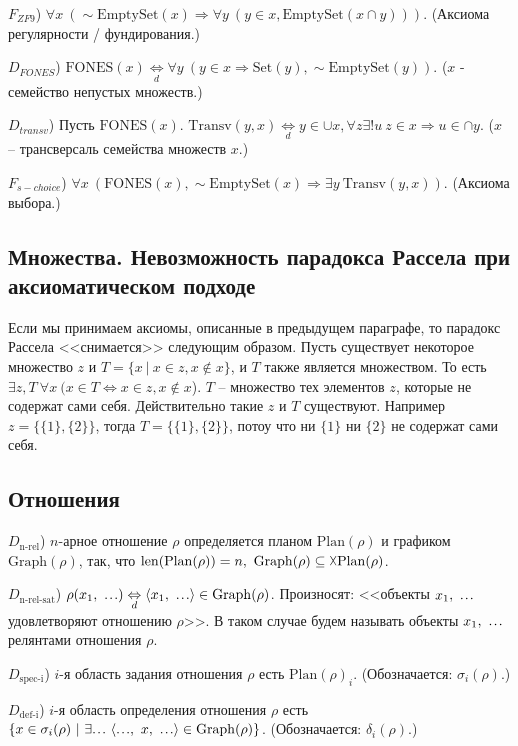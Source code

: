 \documentclass[a4paper]{article}
\newcommand\mydots{\hbox to 1em{.\hss.\hss.}}
\newcommand{\Def}[0]{\underset{d}{\Leftrightarrow}}
\newcommand{\Plan}[1]{\mathrm{Plan}(#1)}
\newcommand{\Graph}[1]{\mathrm{Graph}(#1)}
\newcommand{\len}[1]{\mathrm{len}(#1)}
\newcommand{\EmptySet}[1]{\mathrm{EmptySet}(#1)}
\newcommand{\FONES}[1]{\mathrm{FONES}(#1)}
\newcommand{\Set}[1]{\mathrm{Set}(#1)}
\newcommand{\Transv}[2]{\mathrm{Transv}(#1, #2)}
\begin{document}
$F_{ZF9}$) $\forall x~ (\sim \EmptySet{x} \Rightarrow \forall y~ (y \in x, \EmptySet{x \cap y}))$. (Аксиома регулярности / фундирования.)

$D_{FONES}$) $\FONES{x} \Def \forall y~ (y \in x \Rightarrow \Set{y}, \sim \EmptySet{y})$. ($x$ - семейство непустых множеств.)

$D_{transv}$) Пусть $\FONES{x}$. $\Transv{y}{x} \Def y \in \cup x, \forall z \exists! u~ z \in x \Rightarrow u \in \cap y$. ($x$ -- трансверсаль семейства множеств $x$.)

$F_{s-choice}$) $\forall x~ (\FONES{x}, \sim \EmptySet{x} \Rightarrow \exists y~ \Transv{y}{x})$. (Аксиома выбора.)

\subsection{Множества. Невозможность парадокса Рассела при аксиоматическом подходе}

Если мы принимаем аксиомы, описанные в предыдущем параграфе, то парадокс Рассела <<снимается>> следующим образом. Пусть существует некоторое множество $z$ и $T = \{x ~|~ x \in z, x \notin x\}$, и $T$ также является множеством. То есть $\exists z, T~ \forall x~ (x \in T \Leftrightarrow x \in z, x \notin x$). $T$ -- множество тех элементов $z$, которые не содержат сами себя. Действительно такие $z$ и $T$ существуют. Например $z = \{\{1\}, \{2\}\}$, тогда $T = \{\{1\}, \{2\}\}$, потоу что ни $\{1\}$ ни $\{2\}$ не содержат сами себя.

\subsection{Отношения}

$D_\text{n-rel}$) $n$-арное отношение $\rho$ определяется планом $\Plan{\rho}$ и графиком $\Graph{\rho}$, так, что $\len{\Plan{\rho}} = n,~ \Graph{\rho} \subseteq \vartimes \Plan{\rho}$.

$D_\text{n-rel-sat}$) $\rho(x_1,~ \mydots) \Def \langle x_1,~ \mydots \rangle \in \Graph{\rho}$. Произносят: <<объекты $x_1,~ \mydots$ удовлетворяют отношению $\rho$>>. В таком случае будем называть объекты $x_1,~ \mydots$ релянтами отношения $\rho$.

$D_\text{spec-i}$) $i$-я область задания отношения $\rho$ есть $\Plan{\rho}_i$. (Обозначается: $\sigma_i(\rho)$.)

$D_\text{def-i}$) $i$-я область определения отношения $\rho$ есть $\{ x \in \sigma_i(\rho) ~|~ \exists \mydots~ \langle \mydots,~ x,~ \mydots \rangle \in \Graph{\rho} \}$. (Обозначается: $\delta_i(\rho)$.)
\end{document}
